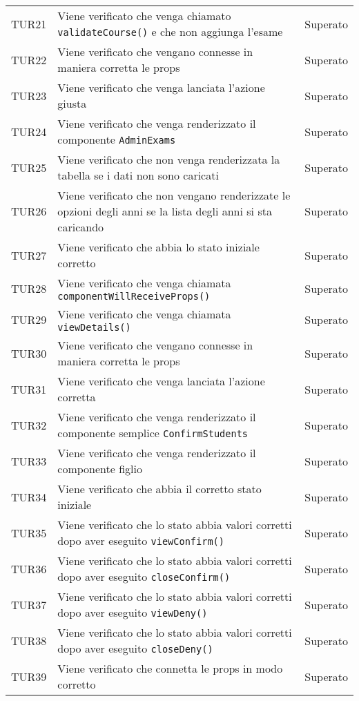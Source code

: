 \documentclass[PianoDiQualifica.tex]{subfiles}
\begin{document}
\begin{longtable}[H]{P{2cm}P{8.5cm}P{3cm}}
	TUR21 & Viene verificato che venga chiamato \texttt{validateCourse()} e che non  aggiunga l'esame & Superato \\ 
	TUR22 & Viene verificato che vengano connesse in maniera corretta le props & Superato \\ 
	TUR23 & Viene verificato che venga lanciata l'azione giusta & Superato \\ 
	TUR24 & Viene verificato che venga renderizzato il componente \texttt{AdminExams} & Superato \\ 
	TUR25 & Viene verificato che non venga renderizzata la tabella se i dati non sono caricati & Superato \\ 
	TUR26 & Viene verificato che non vengano renderizzate le opzioni degli anni se la lista degli anni si sta caricando & Superato \\ 
	TUR27 & Viene verificato che abbia lo stato iniziale corretto & Superato \\ 
	TUR28 & Viene verificato che venga chiamata \texttt{componentWillReceiveProps()} & Superato \\ 
	TUR29 & Viene verificato che venga chiamata \texttt{viewDetails()} & Superato \\ 
	TUR30 & Viene verificato che vengano connesse in maniera corretta le props & Superato \\ 
	TUR31 & Viene verificato che venga lanciata l'azione corretta & Superato \\ 
	TUR32 & Viene verificato che venga renderizzato il componente semplice \texttt{ConfirmStudents} & Superato \\ 
	TUR33 & Viene verificato che venga renderizzato il componente figlio & Superato \\ 
	TUR34 & Viene verificato che abbia il corretto stato iniziale & Superato \\ 
	TUR35 & Viene verificato che lo stato abbia valori corretti dopo aver eseguito \texttt{viewConfirm()} & Superato \\ 
	TUR36 & Viene verificato che lo stato abbia valori corretti dopo aver eseguito \texttt{closeConfirm()}  & Superato \\ 
	TUR37 & Viene verificato che lo stato abbia valori corretti dopo aver eseguito \texttt{viewDeny()} & Superato \\ 
	TUR38 & Viene verificato che lo stato abbia valori corretti dopo aver eseguito \texttt{closeDeny()} & Superato \\ 
	TUR39 & Viene verificato che connetta le props in modo corretto & Superato \\ 

\end{longtable}
\end{document}
